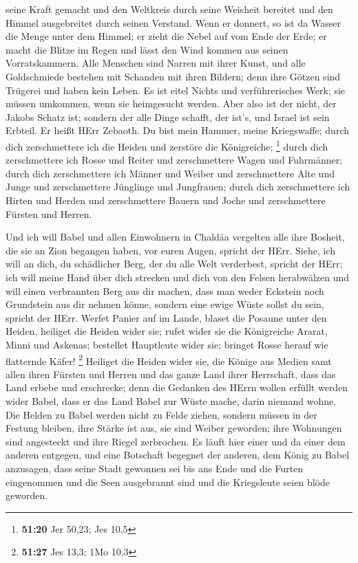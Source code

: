 seine Kraft gemacht und den Weltkreis durch seine Weisheit bereitet und
den Himmel ausgebreitet durch seinen Verstand.  Wenn er
donnert, so ist da Wasser die Menge unter dem Himmel; er zieht die Nebel
auf vom Ende der Erde; er macht die Blitze im Regen und lässt den Wind
kommen aus seinen Vorratskammern.  Alle Menschen sind
Narren mit ihrer Kunst, und alle Goldschmiede bestehen mit Schanden mit
ihren Bildern; denn ihre Götzen sind Trügerei und haben kein Leben.
 Es ist eitel Nichts und verführerisches Werk; sie müssen
umkommen, wenn sie heimgesucht werden.  Aber also ist der
nicht, der Jakobs Schatz ist; sondern der alle Dinge schafft, der ist's,
und Israel ist sein Erbteil. Er heißt HErr Zebaoth.  Du
bist mein Hammer, meine Kriegswaffe; durch dich zerschmettere ich die
Heiden und zerstöre die Königreiche; \footnote{\textbf{51:20} Jer 50,23;
  Jes 10,5}  durch dich zerschmettere ich Rosse und Reiter
und zerschmettere Wagen und Fuhrmänner;  durch dich
zerschmettere ich Männer und Weiber und zerschmettere Alte und Junge und
zerschmettere Jünglinge und Jungfrauen;  durch dich
zerschmettere ich Hirten und Herden und zerschmettere Bauern und Joche
und zerschmettere Fürsten und Herren.

 Und ich will Babel und allen Einwohnern in Chaldäa
vergelten alle ihre Bosheit, die sie an Zion begangen haben, vor euren
Augen, spricht der HErr.  Siehe, ich will an dich, du
schädlicher Berg, der du alle Welt verderbest, spricht der HErr; ich
will meine Hand über dich strecken und dich von den Felsen herabwälzen
und will einen verbrannten Berg aus dir machen,  dass man
weder Eckstein noch Grundstein aus dir nehmen könne, sondern eine ewige
Wüste sollst du sein, spricht der HErr.  Werfet Panier auf
im Lande, blaset die Posaune unter den Heiden, heiliget die Heiden wider
sie; rufet wider sie die Königreiche Ararat, Minni und Askenas;
bestellet Hauptleute wider sie; bringet Rosse herauf wie flatternde
Käfer! \footnote{\textbf{51:27} Jes 13,3; 1Mo 10,3} 
Heiliget die Heiden wider sie, die Könige aus Medien samt allen ihren
Fürsten und Herren und das ganze Land ihrer Herrschaft, 
dass das Land erbebe und erschrecke; denn die Gedanken des HErrn wollen
erfüllt werden wider Babel, dass er das Land Babel zur Wüste mache,
darin niemand wohne.  Die Helden zu Babel werden nicht zu
Felde ziehen, sondern müssen in der Festung bleiben, ihre Stärke ist
aus, sie sind Weiber geworden; ihre Wohnungen sind angesteckt und ihre
Riegel zerbrochen.  Es läuft hier einer und da einer dem
anderen entgegen, und eine Botschaft begegnet der anderen, dem König zu
Babel anzusagen, dass seine Stadt gewonnen sei bis ans Ende
 und die Furten eingenommen und die Seen ausgebrannt sind
und die Kriegsleute seien blöde geworden.

